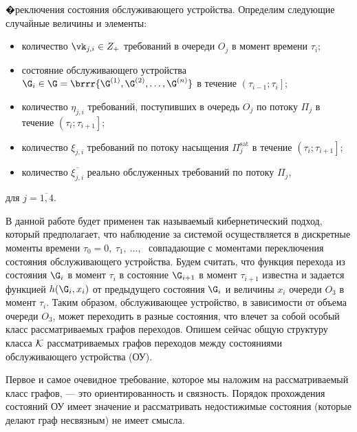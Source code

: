 �реключения состояния обслуживающего устройства. Определим следующие случайные величины и элементы:
\begin{itemize}
\item количество $\vk_{j,i} \in Z_+ $ требований в очереди $O_j$ в момент времени $\tau_i$;
\item состояние обслуживающего устройства $\G_i\in \G = \brrr{\G^{(1)},\G^{(2)}, \ldots, \G^{(n)}}$ в течение $\left(\tau_{i-1};\tau_i\right]$;
\item количество $\eta_{j,i}$ требований, поступивших в очередь $O_j$ по потоку $\Pi_j$ в течение $\left(\tau_{i};\tau_{i+1}\right]$;
\item количество $\xi_{j,i}$ требований по потоку насыщения $\Pi^{\mathrm{sat}}_j$ в течение $\left(\tau_{i};\tau_{i+1}\right]$;
\item количество $\overline{\xi_{j,i}}$ реально обслуженных требований по потоку $\Pi_j$,
\end{itemize}
для $j=\overline{1,4}$.






В данной работе будет применен так называемый кибернетический подход, который предполагает, что наблюдение за системой осуществляется в дискретные моменты времени $\tau_0 = 0,~ \tau_1,~ \ldots$,~  совпадающие с моментами переключения состояния обслуживающего устройства. 
Будем считать, что функция перехода из состояния $\G_i$ в момент $\tau_i$ в состояние $\G_{i+1}$ в момент $\tau_{i+1}$ известна и задается функцией $h(\G_i,x_i)$ от предыдущего состояния $\G_i$ и величины $x_i$ очереди $O_3$ в момент $\tau_i$. Таким образом, обслуживающее устройство, в зависимости от объема очереди $O_3$, может переходить в разные состояния, что влечет за собой особый класс рассматриваемых графов переходов. Опишем сейчас общую структуру класса ${\cal K}$ рассматриваемых графов переходов между состояниями обслуживающего устройства (ОУ).

Первое и самое очевидное требование, которое мы наложим на рассматриваемый класс графов, --- это ориентированность и связность. Порядок прохождения состояний ОУ имеет значение и рассматривать недостижимые состояния (которые делают граф несвязным) не имеет смысла.

